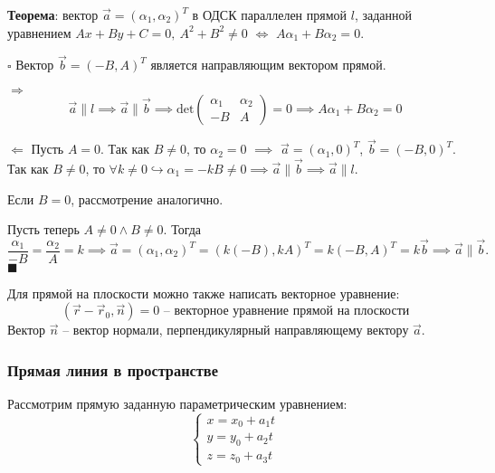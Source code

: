 \documentclass[12pt, a4paper, reqno]{article}
\begin{document}
    \textbf{Теорема}: вектор $\vec{a} = (\alpha_1, \alpha_2)^T$ в ОДСК параллелен прямой $l$,
    заданной уравнением $Ax + By + C = 0,\ A^2 + B^2 \neq 0$ $\iff$ $A\alpha_1 + B\alpha_2 = 0$.

    $\square$
    Вектор $\vec{b} = (-B, A)^T$ является направляющим вектором прямой.

    $\boxed{\Rightarrow}$
    \begin{equation*}
        \vec{a} \parallel l \implies \vec{a} \parallel \vec{b} \implies \text{det}
        \begin{pmatrix}
            \alpha_1 & \alpha_2 \\
            -B       & A
        \end{pmatrix} = 0 \implies A \alpha_1 + B \alpha_2 = 0
    \end{equation*}

    $\boxed{\Leftarrow}$
    Пусть $A = 0$. Так как $B \neq 0$, то $\alpha_2 = 0$ $\implies$ $\vec{a} = (\alpha_1, 0)^T$,
    $\vec{b} = (-B, 0)^T$. Так как $B \neq 0$, то $\forall k \neq 0 \hookrightarrow \alpha_1 = -kB \neq 0
    \implies \vec{a} \parallel \vec{b} \implies \vec{a} \parallel l$.

    Если $B = 0$, рассмотрение аналогично.

    Пусть теперь $A \neq 0 \wedge B \neq 0$. Тогда
    \begin{equation*}
        \dfrac{\alpha_1}{-B} = \dfrac{\alpha_2}{A} = k \implies \vec{a} = (\alpha_1, \alpha_2)^T =
        (k(-B), kA)^T = k(-B, A)^T = k\vec{b} \implies \vec{a} \parallel \vec{b}.
    \end{equation*}
    $\blacksquare$

    Для прямой на плоскости можно также написать векторное уравнение:
    \begin{equation*}
        \boxed{(\vec{r} - \vec{r}_0, \vec{n}) = 0}\text{ -- векторное уравнение прямой на плоскости}
    \end{equation*}
    Вектор $\vec{n}$ -- вектор нормали, перпендикулярный направляющему вектору $\vec{a}$.

    \subsubsection{Прямая линия в пространстве}

    Рассмотрим прямую заданную параметрическим уравнением:
    \begin{equation*}
        \begin{cases}
            x = x_0 + a_1 t \\
            y = y_0 + a_2 t \\
            z = z_0 + a_3 t
        \end{cases}
    \end{equation*}
\end{document}
